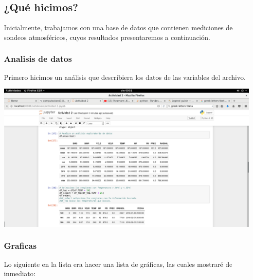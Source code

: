 \documentclass{article}
\begin{document}
\subsection{¿Qué hicimos?}
Inicialmente, trabajamos con una base de datos que contienen mediciones de sondeos atmosféricos, cuyos resultados presentaremos a continuación.

\subsubsection{Analisis de datos}
Primero hicimos un análisis que describiera los datos de las variables del archivo.

    \begin{center}
    \includegraphics[width=20cm]{Analisis.png}
    \end{center}

\subsubsection{Graficas}
Lo siguiente en la lista era hacer una lista de gráficas, las cuales mostraré de inmediato:
\end{document}
